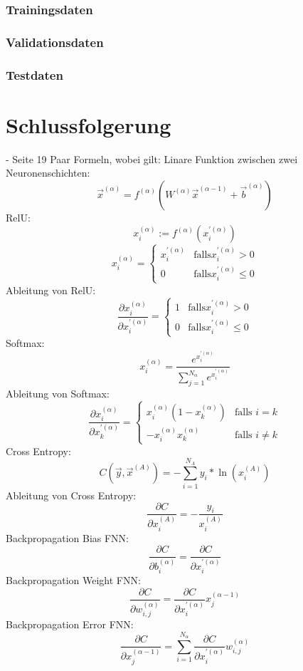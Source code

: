 \documentclass[11pt]{article}
\begin{document}
\subsubsection{Trainingsdaten}
\subsubsection{Validationsdaten}
\subsubsection{Testdaten}


\section{Schlussfolgerung}
- Seite 19
Paar Formeln, wobei gilt:
Linare Funktion zwischen zwei Neuronenschichten:
\[ \vec{x}^{(\alpha)}=f^{(\alpha)}(W^{(\alpha)} \vec{x}^{(\alpha-1)} + \vec{b}^{(\alpha)}) \]
RelU:
\[ x_i^{(\alpha)} := f^{(\alpha)}(x_i^{'(\alpha)}) \]
\[ x_i^{(\alpha)}= \left\{
	\begin{array}{ll}
		x_i^{'(\alpha)}  & \mathrm{falls } x_i^{'(\alpha)} > 0 \\
		0 & \mathrm{falls } x_i^{'(\alpha)} \leq 0
	\end{array}
\right. \]
Ableitung von RelU:
\[ \frac{\partial x_i^{(\alpha)}}{\partial x_i^{'(\alpha)}} = \left\{
	\begin{array}{ll}
		1  & \mathrm{falls } x_i^{'(\alpha)} > 0 \\
		0 & \mathrm{falls } x_i^{'(\alpha)} \leq 0
	\end{array}
\right. \]
Softmax:
\[ x_i^{(\alpha)} = \frac{e^{x_i^{'(\alpha)}}}{\sum_{j=1}^{N_{\alpha}} e^{x_i^{'(\alpha)}}} \]
Ableitung von Softmax:
\[ \frac{\partial x_i^{(\alpha)}}{\partial x_k^{'(\alpha)}} = \left\{
	\begin{array}{ll}
		x_i^{(\alpha)}(1-x_k^{(\alpha)})  & \mbox{falls } i = k \\
		-x_i^{(\alpha)}x_k^{(\alpha)} & \mbox{falls } i \neq k
	\end{array}
\right. \]
Cross Entropy:
\[ C(\vec{y},\vec{x}^{(A)}) = -\sum_{i=1}^{N_A} y_i * \ln(x_i^{(A)}) \]
Ableitung von Cross Entropy:
\[ \frac{\partial C}{\partial x_i^{(A)}} = -\frac{y_i}{x_i^{(A)}} \]
Backpropagation Bias FNN:
\[ \frac{\partial C}{\partial b_i^{(\alpha)}} = \frac{\partial C}{\partial x_i^{'(\alpha)}} \]
Backpropagation Weight FNN:
\[ \frac{\partial C}{\partial w_{i,j}^{(\alpha)}} = \frac{\partial C}{\partial x_i^{'(\alpha)}} x_j^{(\alpha-1)} \]
Backpropagation Error FNN:
\[ \frac{\partial C}{\partial x_{j}^{(\alpha-1)}} = \sum_{i=1}^{N_{\alpha}} \frac{\partial C}{\partial x_i^{'(\alpha)}} w_{i,j}^{(\alpha)} \]
\end{document}

